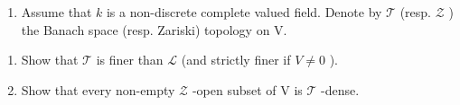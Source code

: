 \begin{enumerate}
\def\labelenumi{\arabic{enumi})}
\setcounter{enumi}{3}
\tightlist
\item
  Assume that \(k\) is a non-discrete complete valued field. Denote by \(\mathcal{T}\) (resp. \(\mathcal{Z}\) ) the Banach space (resp. Zariski) topology on V.
\end{enumerate}

\begin{enumerate}
\def\labelenumi{\alph{enumi})}
\item
  Show that \(\mathcal{T}\) is finer than \(\mathcal{L}\) (and strictly finer if \(V \neq 0\) ).
\item
  Show that every non-empty \(\mathcal{Z}\) -open subset of V is \(\mathcal{T}\) -dense.
\end{enumerate}


